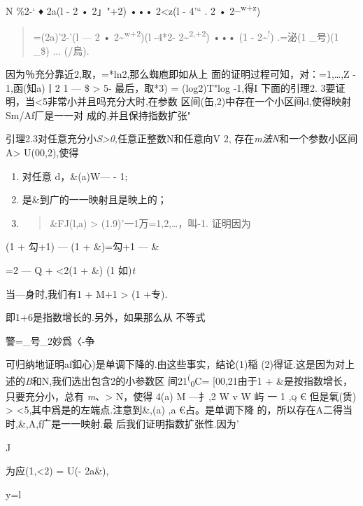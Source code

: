 \documentclass{article}
\begin{document}
N \%2-` ♦ 2a(l - 2 • 2」"+2) ••• 2\textless{}z(l - 4'`` . 2 •
2\textsuperscript{\_w+z})

\begin{quote}
=(2a)'2-'(l --- 2 • 2\textasciitilde{}\textsuperscript{w+2})(l -4*2-
2\textasciitilde{}\textsuperscript{2,+2}) ••• (1 -
2\textasciitilde{}\textsuperscript{!}) .=泌(1 \_号)(1 \_\$) ... (/烏).
\end{quote}

因为％充分靠近2,取，=*ln2,那么蜘庖即如从上
面的证明过程可知，对：=1,\ldots{},Z - 1,函(知a)丨2 1 --- \$
\textgreater{} 5- 最后，取*3) = (log2)T"log -1,得I 下面的引理2.
3要证明，当\textless{}5非常小并且吗充分大时,在参数
区间(缶,2)中存在一个小区间d,使得映射Sm/Af厂是一一对
成的,并且保持指数扩张"

引理2.3对任意充分小\emph{S\textgreater{}0,}任意正整数N和任意向V 2,
存在\emph{m法N}和一个参数小区间A\textgreater{} U(00,2),使得

\begin{enumerate}
\def\labelenumi{(\arabic{enumi})}
\item
  对任意 d，\&(a)W--- - 1;
\item
  是\&到广的一一映射且是映上的；
\item
  \begin{quote}
  \textbar{}\&FJ(l,a)\textbar{} \textgreater{}
  (1.9)'一1万=1,2,\ldots{}，叫-1. 证明因为
  \end{quote}
\end{enumerate}

(1 + 勾+1) --- (1 + \&)=勾+1 --- \&

=2 --- Q + \textless{}2(1 + \&) (1 如)\emph{t}

当---身时,我们有1 + M+1 \textgreater{} \textbar{}(1 +专).

即1+6是指数增长的.另外，如果那么从 不等式

警=\_号\_2妙爲〈-争

可归纳地证明af釦心)是单调下降的.由这些事实，结论(1)稲
(2)得证.这是因为对上述的\emph{B}和N,我们选出包含2的小参数区
间21\textsuperscript{(}\textsubscript{0}C= {[}00,21由于1 +
\&是按指数增长，只要充分小，总有 \emph{m、}\textgreater{} N，使得 4(a) M
---扌,2 W v W 屿 一 1 \textsc{,q €} 但是氧(赁) \textgreater{}
\textless{}5,其中爲是的左端点.注意到\&,(a) ,a €占。是单调下降
的，所以存在A二得当时,\&,A,f广是一一映射.最 后我们证明指数扩张性.因为'

J

\textbar{}为应(1,\textless{}2)\textbar{} = U(- 2a\&),

y=l
\end{document}
